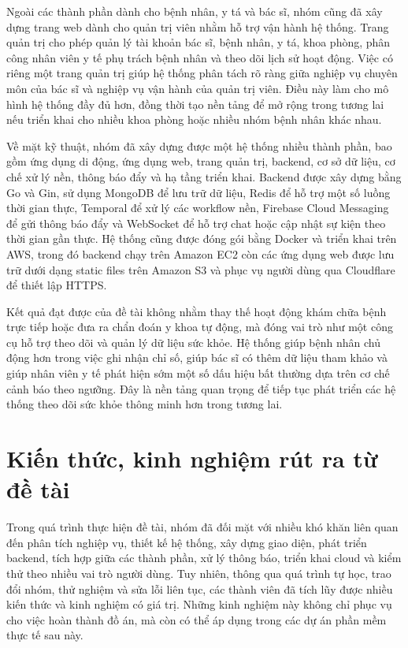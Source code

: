 \par Ngoài các thành phần dành cho bệnh nhân, y tá và bác sĩ, nhóm cũng đã xây dựng trang web dành cho quản trị viên nhằm hỗ trợ vận hành hệ thống. Trang quản trị cho phép quản lý tài khoản bác sĩ, bệnh nhân, y tá, khoa phòng, phân công nhân viên y tế phụ trách bệnh nhân và theo dõi lịch sử hoạt động. Việc có riêng một trang quản trị giúp hệ thống phân tách rõ ràng giữa nghiệp vụ chuyên môn của bác sĩ và nghiệp vụ vận hành của quản trị viên. Điều này làm cho mô hình hệ thống đầy đủ hơn, đồng thời tạo nền tảng để mở rộng trong tương lai nếu triển khai cho nhiều khoa phòng hoặc nhiều nhóm bệnh nhân khác nhau.

\par Về mặt kỹ thuật, nhóm đã xây dựng được một hệ thống nhiều thành phần, bao gồm ứng dụng di động, ứng dụng web, trang quản trị, backend, cơ sở dữ liệu, cơ chế xử lý nền, thông báo đẩy và hạ tầng triển khai. Backend được xây dựng bằng Go và Gin, sử dụng MongoDB để lưu trữ dữ liệu, Redis để hỗ trợ một số luồng thời gian thực, Temporal để xử lý các workflow nền, Firebase Cloud Messaging để gửi thông báo đẩy và WebSocket để hỗ trợ chat hoặc cập nhật sự kiện theo thời gian gần thực. Hệ thống cũng được đóng gói bằng Docker và triển khai trên AWS, trong đó backend chạy trên Amazon EC2 còn các ứng dụng web được lưu trữ dưới dạng static files trên Amazon S3 và phục vụ người dùng qua Cloudflare để thiết lập HTTPS.

\par Kết quả đạt được của đề tài không nhằm thay thế hoạt động khám chữa bệnh trực tiếp hoặc đưa ra chẩn đoán y khoa tự động, mà đóng vai trò như một công cụ hỗ trợ theo dõi và quản lý dữ liệu sức khỏe. Hệ thống giúp bệnh nhân chủ động hơn trong việc ghi nhận chỉ số, giúp bác sĩ có thêm dữ liệu tham khảo và giúp nhân viên y tế phát hiện sớm một số dấu hiệu bất thường dựa trên cơ chế cảnh báo theo ngưỡng. Đây là nền tảng quan trọng để tiếp tục phát triển các hệ thống theo dõi sức khỏe thông minh hơn trong tương lai.

\section{Kiến thức, kinh nghiệm rút ra từ đề tài}
\par Trong quá trình thực hiện đề tài, nhóm đã đối mặt với nhiều khó khăn liên quan đến phân tích nghiệp vụ, thiết kế hệ thống, xây dựng giao diện, phát triển backend, tích hợp giữa các thành phần, xử lý thông báo, triển khai cloud và kiểm thử theo nhiều vai trò người dùng. Tuy nhiên, thông qua quá trình tự học, trao đổi nhóm, thử nghiệm và sửa lỗi liên tục, các thành viên đã tích lũy được nhiều kiến thức và kinh nghiệm có giá trị. Những kinh nghiệm này không chỉ phục vụ cho việc hoàn thành đồ án, mà còn có thể áp dụng trong các dự án phần mềm thực tế sau này.

